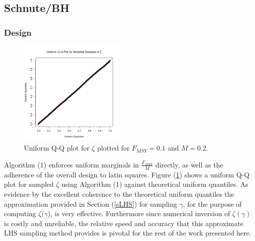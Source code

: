 \documentclass[12pt]{article}
\begin{document}

%
\subsection{Schnute/BH}

%
\subsubsection{Design}


%
\begin{figure}
\vspace{-2cm}
\includegraphics[width=0.45\textwidth]{../gpBias/qqUnif.png}
\vspace{-1cm} %
\caption{Uniform Q-Q plot for $\zeta$ plotted for $F_{MSY}=0.1$ and $M=0.2$.}
\label{qqZeta}
\end{figure}

%
Algorithm (1) enforces uniform marginals in $\frac{F_{MSY}}{M}$ directly, as well
as the adherence of the overall design to latin squares.  
Figure (\ref{qqZeta}) shows a uniform Q-Q plot for sampled $\zeta$ using 
Algorithm (1) against theoretical uniform quantiles. As evidence by the 
excellent coherence to the theoretical uniform quantiles the approximation
provided in Section (\ref{sLHS}) for sampling $\gamma$, for the purpose of 
computing $\zeta(\gamma$), is very effective. 
Furthermore since numerical inversion of $\zeta(\gamma)$ is costly and 
unreliable, the relative speed and accuracy that this approximate LHS sampling 
method provides is pivotal for the rest of the work presented here. %

%
\end{document}
